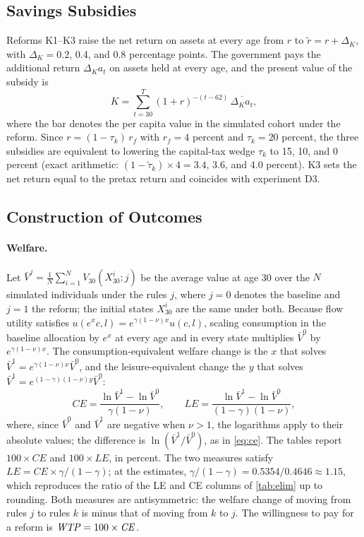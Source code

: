 \subsection{Savings Subsidies}

Reforms K1--K3 raise the net return on assets at every age from $r$ to $\tilde r=r+\Delta_K$, with $\Delta_K=0.2$, 0.4, and 0.8 percentage points. The government pays the additional return $\Delta_K a_t$ on assets held at every age, and the present value of the subsidy is
\begin{equation*}
K=\sum_{t=30}^{T}(1+r)^{-(t-62)}\,\overline{\Delta_K a_t},
\end{equation*}
where the bar denotes the per capita value in the simulated cohort under the reform. Since $r=(1-\tau_k)\,r_f$ with $r_f=4$ percent and $\tau_k=20$ percent, the three subsidies are equivalent to lowering the capital-tax wedge $\tau_k$ to 15, 10, and 0 percent (exact arithmetic: $(1-\tilde\tau_k)\times 4=3.4$, 3.6, and 4.0 percent). K3 sets the net return equal to the pretax return and coincides with experiment D3.

\subsection{Construction of Outcomes}\label{app:outcomes}

\paragraph{Welfare.} Let $\bar V^{j}=\frac{1}{N}\sum_{i=1}^{N}V_{30}(X^{i}_{30};j)$ be the average value at age 30 over the $N$ simulated individuals under the rules $j$, where $j=0$ denotes the baseline and $j=1$ the reform; the initial states $X^{i}_{30}$ are the same under both. Because flow utility satisfies $u(e^{x}c,l)=e^{\gamma(1-\nu)x}u(c,l)$, scaling consumption in the baseline allocation by $e^{x}$ at every age and in every state multiplies $\bar V^{0}$ by $e^{\gamma(1-\nu)x}$. The consumption-equivalent welfare change is the $x$ that solves $\bar V^{1}=e^{\gamma(1-\nu)x}\bar V^{0}$, and the leisure-equivalent change the $y$ that solves $\bar V^{1}=e^{(1-\gamma)(1-\nu)y}\bar V^{0}$:
\begin{equation*}
\mathit{CE}=\frac{\ln\bar V^{1}-\ln\bar V^{0}}{\gamma(1-\nu)},
\qquad
\mathit{LE}=\frac{\ln\bar V^{1}-\ln\bar V^{0}}{(1-\gamma)(1-\nu)},
\end{equation*}
where, since $\bar V^{0}$ and $\bar V^{1}$ are negative when $\nu>1$, the logarithms apply to their absolute values; the difference is $\ln(\bar V^{1}/\bar V^{0})$, as in \eqref{eq:ce}. The tables report $100\times\mathit{CE}$ and $100\times\mathit{LE}$, in percent. The two measures satisfy $\mathit{LE}=\mathit{CE}\times\gamma/(1-\gamma)$; at the estimates, $\gamma/(1-\gamma)=0.5354/0.4646\approx1.15$, which reproduces the ratio of the LE and CE columns of \autoref{tab:elim} up to rounding. Both measures are antisymmetric: the welfare change of moving from rules $j$ to rules $k$ is minus that of moving from $k$ to $j$. The willingness to pay for a reform is $\mathit{WTP}=100\times\mathit{CE}$.

